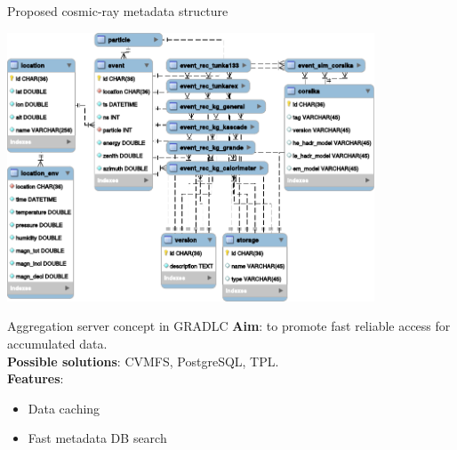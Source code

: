 
\begin{frame}{Proposed cosmic-ray metadata structure}
    \vspace{-1.5em}
    \begin{center}
        \includegraphics[width=0.82\textwidth]{pics/metadata.pdf}
    \end{center}
\end{frame}

\begin{frame}{Aggregation server concept in GRADLC}
\textbf{Aim}: to promote fast reliable access for accumulated data.
\vspace{\itemsep}\\
\textbf{Possible solutions}: CVMFS, PostgreSQL, TPL.
\vspace{\itemsep}\\
\textbf{Features}:
  \begin{itemize}
    \item Data caching
    \item Fast metadata DB search
  \end{itemize}
\end{frame}

